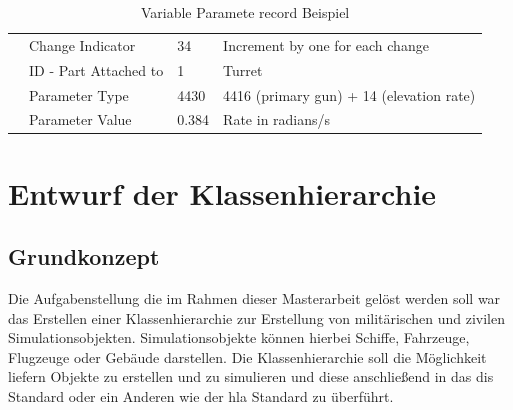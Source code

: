 \begin{table}[H]
{\begin{tabular}{|l|l|l|l|}
			& Change Indicator      & 34             & Increment by one for each change         \\ \cline{2-4} 
			& ID - Part Attached to & 1              & Turret                             \\ \cline{2-4} 
			& Parameter Type        & 4430           & 4416 (primary gun) + 14 (elevation rate) \\ \cline{2-4} 
			& Parameter Value       &0.384         & Rate in radians/s                        \\ \hline
	\end{tabular}}
	\caption[Variable Parameter record Beispiel ]{Variable Paramete record Beispiel\cite{SISOStandardsActivityCommitteeoftheIEEEComputerSociety.}}
	\label{variableex}
\end{table}


\chapter{Entwurf der Klassenhierarchie }


\section{Grundkonzept}
Die Aufgabenstellung die im Rahmen dieser Masterarbeit gelöst werden soll war das Erstellen einer Klassenhierarchie zur Erstellung von militärischen und zivilen Simulationsobjekten. Simulationsobjekte können hierbei Schiffe, Fahrzeuge, Flugzeuge oder Gebäude darstellen. Die Klassenhierarchie soll die Möglichkeit liefern Objekte zu erstellen und zu simulieren und  diese anschließend in  das \ac{dis} Standard oder ein Anderen  wie der \ac{hla} Standard zu überführt.   
 
